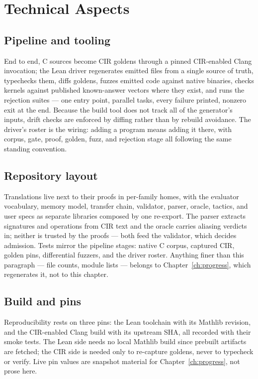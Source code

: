 \chapter{Technical Aspects}
\label{ch:technical}

\section{Pipeline and tooling}

End to end, C sources become CIR goldens through a pinned CIR-enabled
Clang invocation; the Lean driver regenerates emitted files from a single
source of truth, typechecks them, diffs goldens, fuzzes emitted code
against native binaries, checks kernels against published known-answer
vectors where they exist, and runs the rejection suites --- one entry
point, parallel tasks, every failure printed, nonzero exit at the end.
Because the build tool does not track all of the generator's inputs,
drift checks are enforced by diffing rather than by rebuild avoidance.
The driver's roster is the wiring: adding a program means adding it
there, with corpus, gate, proof, golden, fuzz, and rejection stage all
following the same standing convention.

\section{Repository layout}

Translations live next to their proofs in per-family homes, with the
evaluator vocabulary, memory model, transfer chain, validator,
parser, oracle, tactics, and user specs as separate libraries
composed by one re-export. The parser extracts signatures and
operations from CIR text and the oracle carries aliasing verdicts in;
neither is trusted by the proofs --- both feed the validator, which
decides admission. Tests mirror the pipeline stages: native C corpus, captured
CIR, golden pins, differential fuzzers, and the driver roster. Anything
finer than this paragraph --- file counts, module lists --- belongs to
Chapter~\ref{ch:progress}, which regenerates it, not to this chapter.

\section{Build and pins}

Reproducibility rests on three pins: the Lean toolchain with its Mathlib
revision, and the CIR-enabled Clang build with its upstream SHA, all
recorded with their smoke tests. The Lean side needs no local Mathlib
build since prebuilt artifacts are fetched; the CIR side is needed only
to re-capture goldens, never to typecheck or verify. Live pin values are
snapshot material for Chapter~\ref{ch:progress}, not prose here.
